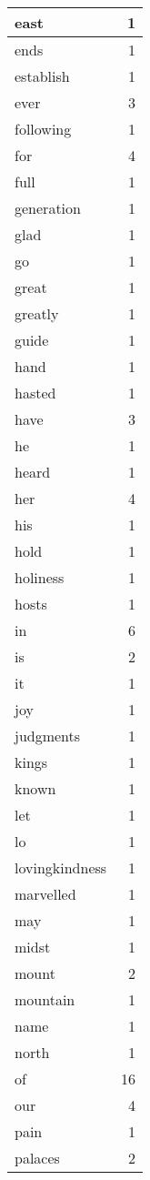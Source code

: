 \begin{center}
\begin{longtable}{l|r}
east & 1 \\ \hline
ends & 1 \\ \hline
establish & 1 \\ \hline
ever & 3 \\ \hline
following & 1 \\ \hline
for & 4 \\ \hline
full & 1 \\ \hline
generation & 1 \\ \hline
glad & 1 \\ \hline
go & 1 \\ \hline
great & 1 \\ \hline
greatly & 1 \\ \hline
guide & 1 \\ \hline
hand & 1 \\ \hline
hasted & 1 \\ \hline
have & 3 \\ \hline
he & 1 \\ \hline
heard & 1 \\ \hline
her & 4 \\ \hline
his & 1 \\ \hline
hold & 1 \\ \hline
holiness & 1 \\ \hline
hosts & 1 \\ \hline
in & 6 \\ \hline
is & 2 \\ \hline
it & 1 \\ \hline
joy & 1 \\ \hline
judgments & 1 \\ \hline
kings & 1 \\ \hline
known & 1 \\ \hline
let & 1 \\ \hline
lo & 1 \\ \hline
lovingkindness & 1 \\ \hline
marvelled & 1 \\ \hline
may & 1 \\ \hline
midst & 1 \\ \hline
mount & 2 \\ \hline
mountain & 1 \\ \hline
name & 1 \\ \hline
north & 1 \\ \hline
of & 16 \\ \hline
our & 4 \\ \hline
pain & 1 \\ \hline
palaces & 2 \\ \hline

\end{longtable}
\end{center}
